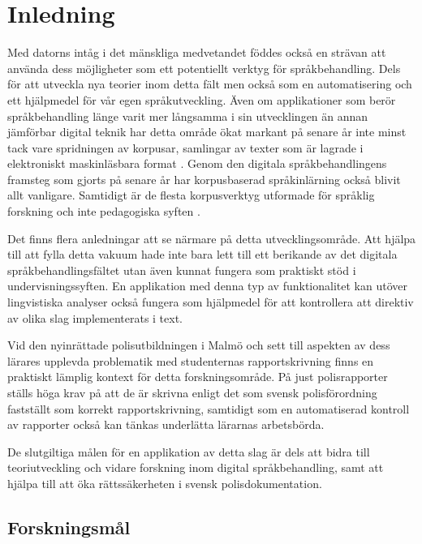 \documentclass[swedish]{maucsthesis}
\begin{document}
\ifodd\value{page}\else\mbox{}\newpage\fi
\tableofcontents
\newpage
\startpagecount

\section{Inledning}
Med datorns intåg i det mänskliga medvetandet föddes också en strävan att använda
dess möjligheter som ett potentiellt verktyg för språkbehandling. Dels för
att utveckla nya teorier inom detta fält men också som en automatisering och ett
hjälpmedel för vår egen språkutveckling. Även om applikationer som berör
språkbehandling länge varit mer långsamma i sin utvecklingen än annan jämförbar
digital teknik har detta område ökat markant på senare år inte minst tack vare
spridningen av korpusar, samlingar av texter som är lagrade i elektroniskt
maskinläsbara format \cite{nugues:2014}. Genom den digitala språkbehandlingens framsteg
som gjorts på senare år har korpusbaserad språkinlärning också blivit allt
vanligare. Samtidigt är de flesta korpusverktyg utformade för språklig
forskning och inte pedagogiska syften \cite{zhu:2015}.

Det finns flera anledningar att se närmare på detta utvecklingsområde. Att hjälpa till att fylla detta vakuum hade inte bara lett till ett berikande av det digitala språkbehandlingsfältet utan även kunnat fungera som praktiskt stöd i undervisningssyften.
En applikation med denna typ av funktionalitet kan utöver lingvistiska analyser
också fungera som hjälpmedel för att kontrollera att direktiv av olika slag
implementerats i text.

Vid den nyinrättade polisutbildningen i Malmö och sett till aspekten av dess
lärares upplevda problematik med studenternas rapportskrivning finns en
praktiskt lämplig kontext för detta forskningsområde. På just polisrapporter
ställs höga krav på att de är skrivna enligt det som svensk polisförordning fastställt som korrekt rapportskrivning, samtidigt som en automatiserad kontroll av rapporter också kan tänkas underlätta lärarnas arbetsbörda.

De slutgiltiga målen för en applikation av detta slag är dels att bidra till
teoriutveckling och vidare forskning inom digital språkbehandling, samt att hjälpa till att
öka rättssäkerheten i svensk polisdokumentation.

\subsection{Forskningsmål}
\end{document}
